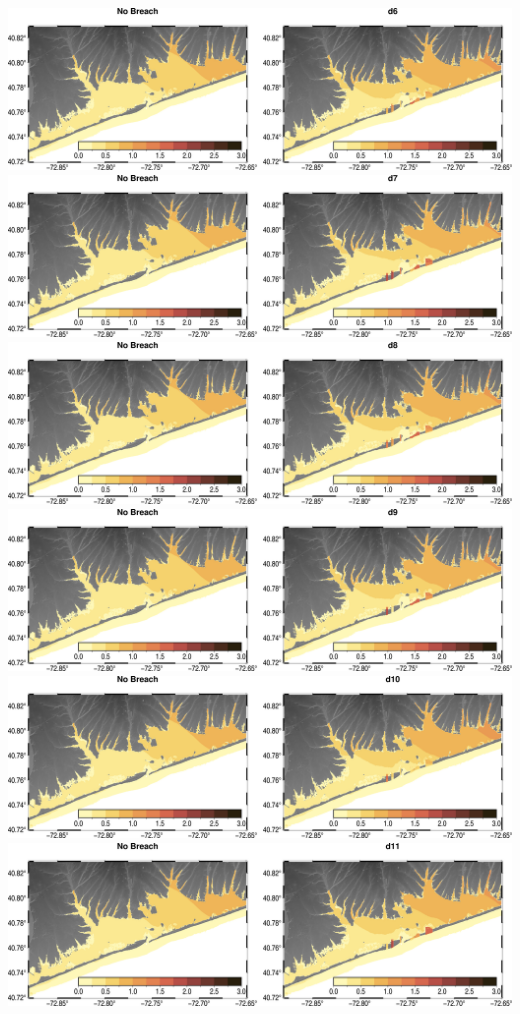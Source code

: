 \includegraphics[width=\textwidth]{images/fgmax/d6_fgmax_no_lines.png}
\includegraphics[width=\textwidth]{images/fgmax/d7_fgmax_no_lines.png}
\includegraphics[width=\textwidth]{images/fgmax/d8_fgmax_no_lines.png}
\includegraphics[width=\textwidth]{images/fgmax/d9_fgmax_no_lines.png}
\includegraphics[width=\textwidth]{images/fgmax/d10_fgmax_no_lines.png}
\includegraphics[width=\textwidth]{images/fgmax/d11_fgmax_no_lines.png}
